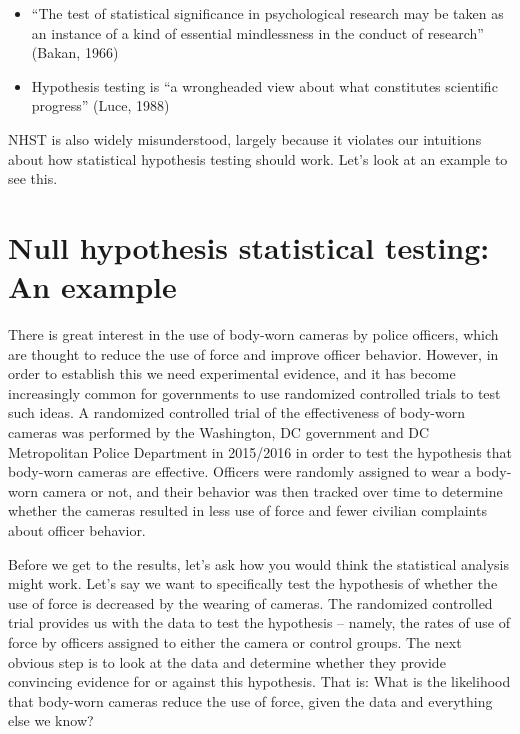 \documentclass[12pt,]{book}
\providecommand{\tightlist}{%
  \setlength{\itemsep}{0pt}\setlength{\parskip}{0pt}}
\theoremstyle{definition}
\theoremstyle{definition}
\theoremstyle{definition}
\theoremstyle{remark}
\begin{document}
\begin{itemize}
\tightlist
\item
  ``The test of statistical significance in psychological research may be taken as an instance of a kind of essential mindlessness in the conduct of research'' (Bakan, 1966)
\item
  Hypothesis testing is ``a wrongheaded view about what constitutes scientific progress'' (Luce, 1988)
\end{itemize}

NHST is also widely misunderstood, largely because it violates our intuitions about how statistical hypothesis testing should work. Let's look at an example to see this.

\hypertarget{null-hypothesis-statistical-testing-an-example}{%
\section{Null hypothesis statistical testing: An example}\label{null-hypothesis-statistical-testing-an-example}}

There is great interest in the use of body-worn cameras by police officers, which are thought to reduce the use of force and improve officer behavior. However, in order to establish this we need experimental evidence, and it has become increasingly common for governments to use randomized controlled trials to test such ideas. A randomized controlled trial of the effectiveness of body-worn cameras was performed by the Washington, DC government and DC Metropolitan Police Department in 2015/2016 in order to test the hypothesis that body-worn cameras are effective. Officers were randomly assigned to wear a body-worn camera or not, and their behavior was then tracked over time to determine whether the cameras resulted in less use of force and fewer civilian complaints about officer behavior.

Before we get to the results, let's ask how you would think the statistical analysis might work. Let's say we want to specifically test the hypothesis of whether the use of force is decreased by the wearing of cameras. The randomized controlled trial provides us with the data to test the hypothesis -- namely, the rates of use of force by officers assigned to either the camera or control groups. The next obvious step is to look at the data and determine whether they provide convincing evidence for or against this hypothesis. That is: What is the likelihood that body-worn cameras reduce the use of force, given the data and everything else we know?
\end{document}
